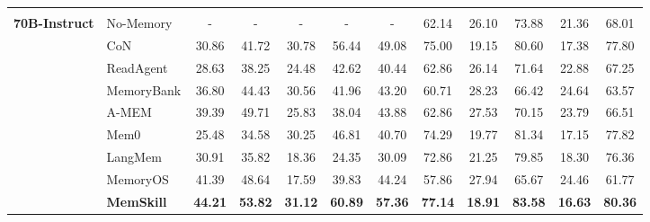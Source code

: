 \begin{table}[t]
\begin{tabular}{>{\centering\arraybackslash}m{0.9cm} l cc cc c | cc cc c}
        \multirow{9}{*}{\rotatebox[origin=c]{90}{\shortstack{\textbf{LLaMA3.3}\\\textbf{70B-Instruct}}}} &
        No-Memory         & - & - & - & - & - & 62.14 & 26.10 & 73.88 & 21.36 & 68.01 \\
        & CoN       & 30.86 & 41.72 & 30.78 & 56.44 & 49.08 & 75.00 & 19.15 & 80.60 & 17.38 & 77.80 \\
        & ReadAgent  & 28.63 & 38.25 & 24.48 & 42.62 & 40.44 & 62.86 & 26.14 & 71.64 & 22.88 & 67.25 \\
        & MemoryBank & 36.80 & 44.43 & 30.56 & 41.96 & 43.20 & 60.71 & 28.23 & 66.42 & 24.64 & 63.57 \\
        & A-MEM      & 39.39 & 49.71 & 25.83 & 38.04 & 43.88 & 62.86 & 27.53 & 70.15 & 23.79 & 66.51 \\
        & Mem0       & 25.48 & 34.58 & 30.25 & 46.81 & 40.70 & 74.29 & 19.77 & 81.34 & 17.15 & 77.82 \\
        & LangMem    & 30.91 & 35.82 & 18.36 & 24.35 & 30.09 & 72.86 & 21.25 & 79.85 & 18.30 & 76.36 \\
        & MemoryOS   & 41.39 & 48.64 & 17.59 & 39.83 & 44.24 & 57.86 & 27.94 & 65.67 & 24.46 & 61.77 \\
        & \cellcolor{hl-llama}\textbf{MemSkill} &
        \cellcolor{hl-llama}\textbf{44.21} & \cellcolor{hl-llama}\textbf{53.82} & \cellcolor{hl-llama}\textbf{31.12} & \cellcolor{hl-llama}\textbf{60.89} &
        \cellcolor{hl-llama}\textbf{57.36} &
        \cellcolor{hl-llama}\textbf{77.14} & \cellcolor{hl-llama}\textbf{18.91} &
        \cellcolor{hl-llama}\textbf{83.58} & \cellcolor{hl-llama}\textbf{16.63} &
        \cellcolor{hl-llama}\textbf{80.36} \\
        \midrule


\end{tabular}
\end{table}

